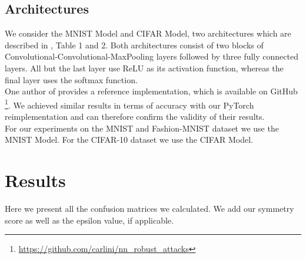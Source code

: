 \documentclass{article}
\begin{document}
\subsection{Architectures}
We consider the MNIST Model and CIFAR Model, two architectures which are described in \cite{carlini2017towards}, Table 1 and 2. Both architectures consist of two blocks of Convolutional-Convolutional-MaxPooling \cite{nagi2011max} layers followed by three fully connected layers. All but the last layer use ReLU \cite{maas2013rectifier} as its activation function, whereas the final layer uses the softmax function.\\
One author of \cite{carlini2017towards} provides a reference implementation, which is available on GitHub \footnote{\url{https://github.com/carlini/nn_robust_attacks}}. We achieved similar results in terms of accuracy with our PyTorch reimplementation and can therefore confirm the validity of their results.  \\
For our experiments on the MNIST and Fashion-MNIST dataset we use the MNIST Model. For the CIFAR-10 dataset we use the CIFAR Model.

\section{Results}
\label{sec:results}
Here we present all the confusion matrices we calculated. We add our symmetry score as well as the epsilon value, if applicable.
\end{document}
